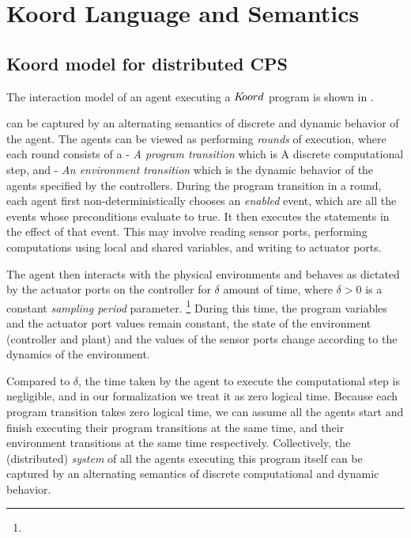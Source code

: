 \section{Koord Language and Semantics}
\subsection{Koord model for distributed CPS}

The interaction model of an agent executing a $K\kern-2pt oord$ program is shown in . 

 can be captured by an alternating semantics of discrete and dynamic behavior of the agent. The agents can be viewed as performing \emph{rounds} of execution, where each round consists of a - \emph{A program transition} which is A discrete computational step, and - \emph{An environment transition} which is the dynamic behavior of the agents specified by the controllers. During the program transition in a round, each agent first non-deterministically chooses an \emph{enabled} event, which are all the events whose preconditions evaluate to true. It then executes the statements in the effect of that event. This may involve reading sensor ports, performing computations using local and shared variables, and writing to actuator ports.

The agent then interacts with the physical environments and behaves as dictated by the actuator ports on the controller for $\delta$ amount of time, where $\delta>0$ is a constant \emph{sampling period} parameter. \footnote{} During this time, the program variables and the actuator port values remain constant, the state of the environment (controller and plant) and the values of the sensor ports change according to the dynamics of the environment.

Compared to $\delta$, the time taken by the agent to execute the computational step is negligible, and in our formalization we treat it as zero logical time. Because each program transition takes zero logical time, we can assume all the agents start and finish executing their program transitions at the same time, and their environment transitions at the same time respectively. Collectively, the (distributed) \emph{system} of all the agents executing this program itself can be captured by an alternating semantics of discrete computational and dynamic behavior.

